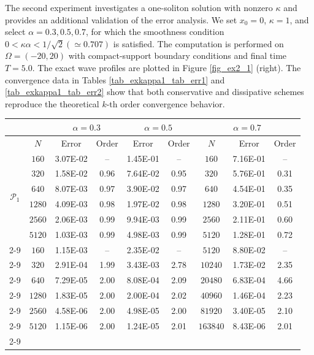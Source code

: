 \documentclass[11pt]{article}
\numberwithin{equation}{section}
\begin{document}
The second experiment investigates a one-soliton solution with nonzero $\kappa$ and provides an additional validation of the error analysis. We set $x_0=0$, $\kappa =1$, and select
$\alpha=0.3,0.5,0.7$, for which the smoothness condition $0<\kappa \alpha<1/\sqrt{2}(\simeq0.707)$ is satisfied. The
computation is performed on $\Omega=(-20,20)$ with compact-support boundary conditions
and final time $T=5.0$. The exact wave profiles are plotted in Figure \ref{fig_ex2_1} (right). The
convergence data in Tables \ref{tab_exkappa1_tab_err1} and \ref{tab_exkappa1_tab_err2} show that both conservative and dissipative schemes
reproduce the theoretical $k$-th order convergence behavior.


\begin{table}[!ht]\centering
\begin{tabular}{|c|c|cc|cc|c|cc|}
  \hline
  & & \multicolumn{2}{c|}{$\alpha=0.3$}&\multicolumn{2}{c|}{$\alpha=0.5$}&\multicolumn{3}{c|}{$\alpha=0.7$}\\ \hline
  & $N$ & Error & Order & Error  & Order& $N$ & Error &Order\\ \hline
\multirow{6}{0.6cm}{$\mathcal{P}_1$}& $  160$ &    3.07E-02&      --   &    1.45E-01&      --   & $   160$ &    7.16E-01&	  --   \\ \cline{2-9}
									& $  320$ &    1.58E-02&     0.96  &    7.64E-02&     0.95	& $   320$ &    5.76E-01&     0.31 \\ \cline{2-9}
									& $  640$ &    8.07E-03&     0.97  &    3.90E-02&     0.97	& $   640$ &    4.54E-01&     0.35 \\ \cline{2-9}
									& $ 1280$ &    4.09E-03&     0.98  &    1.97E-02&     0.98	& $  1280$ &    3.20E-01&     0.51 \\ \cline{2-9}
									& $ 2560$ &    2.06E-03&     0.99  &    9.94E-03&     0.99	& $  2560$ &    2.11E-01&     0.60 \\ \cline{2-9}
									& $ 5120$ &    1.03E-03&     0.99  &    4.98E-03&     0.99	& $  5120$ &    1.28E-01&     0.72 \\ \cline{2-9}
  \hline
\multirow{6}{0.6cm}{$\mathcal{P}_2$}& $  160$ &    1.15E-03&	   -- &    2.35E-02&	  --    & $  5120$&   8.80E-02&   --   \\ \cline{2-9}
									& $  320$ &    2.91E-04&     1.99 &    3.43E-03&     2.78	& $  10240$&  1.73E-02&     2.35   	 \\ \cline{2-9}
									& $  640$ &    7.29E-05&     2.00 &    8.08E-04&     2.09	& $  20480$&  6.83E-04&     4.66    	 \\ \cline{2-9}
									& $ 1280$ &    1.83E-05&     2.00 &    2.00E-04&     2.02	& $  40960$&  1.46E-04 &    2.23	 \\ \cline{2-9}
									& $ 2560$ &    4.58E-06&     2.00 &    4.98E-05&     2.00	& $  81920$&  3.40E-05 &    2.10 	 \\ \cline{2-9}
									& $ 5120$ &    1.15E-06&     2.00 &    1.24E-05&     2.01	& $  163840$& 8.43E-06 &    2.01	 \\ \cline{2-9} \hline


\end{tabular}
\end{table}
\end{document}

